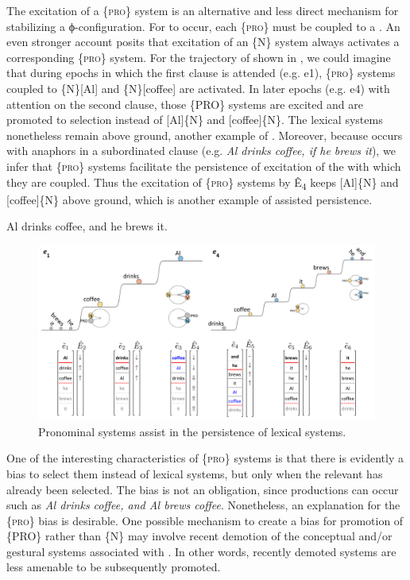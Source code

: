   The excitation of a \{\textsc{pro}\} system is an alternative and less direct mechanism for stabilizing a ϕ-configuration. For  to occur, each \{\textsc{pro}\} must be coupled to a . An even stronger account posits that excitation of an \{N\} system always activates a corresponding \{\textsc{pro}\} system. For the trajectory of  shown in {}, we could imagine that during epochs in which the first clause is attended (e.g. e1), \{\textsc{pro}\} systems coupled to \{N\}[Al] and \{N\}[coffee] are activated. In later epochs (e.g. e4) with attention on the second clause, those \{PRO\} systems are excited and are promoted to selection instead of [Al]\{N\} and [coffee]\{N\}. The lexical systems nonetheless remain above ground, another example of . Moreover, because  occurs with anaphors in a subordinated clause (e.g. \textit{Al drinks coffee, if he brews it}), we infer that \{\textsc{pro}\} systems facilitate the persistence of excitation of the  with which they are coupled. Thus the excitation of \{\textsc{pro}\} systems by Ê\textsubscript{4} keeps [Al]\{N\} and [coffee]\{N\} above ground, which is another example of assisted persistence.

  \ea\label{ex:7:10}
  {Al drinks coffee, and he brews it.}
\z
  
\begin{figure}
\includegraphics[width=\textwidth]{figures/Tilsen-img153.png}
\caption{Pronominal systems assist in the persistence of lexical systems.}
\label{fig:7:9}
\end{figure}
 

  One of the interesting characteristics of \{\textsc{pro}\} systems is that there is evidently a bias to select them instead of lexical systems, but only when the relevant  has already been selected. The bias is not an obligation, since productions can occur such as \textit{Al drinks coffee, and Al brews coffee}. Nonetheless, an explanation for the \{\textsc{pro}\} bias is desirable. One possible mechanism to create a bias for promotion of \{PRO\} rather than \{N\} may involve recent demotion of the conceptual and/or gestural systems associated with . In other words, recently demoted systems are less amenable to be subsequently promoted.

